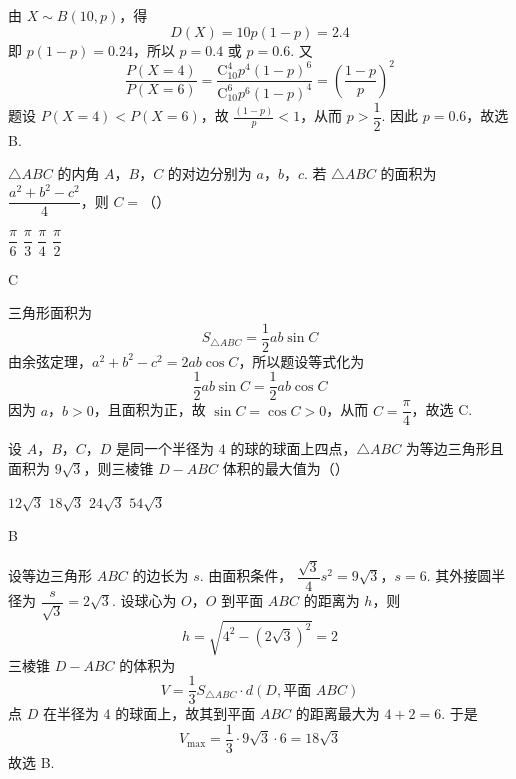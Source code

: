 \begin{solution}
由 \(X\sim B(10,p)\)，得
\[
D(X)=10p(1-p)=2.4
\]
即 \(p(1-p)=0.24\)，所以 \(p=0.4\) 或 \(p=0.6\). 又
\[
\dfrac{P(X=4)}{P(X=6)}
=\dfrac{\mathrm C_{10}^4p^4(1-p)^6}{\mathrm C_{10}^6p^6(1-p)^4}
=\left(\dfrac{1-p}{p}\right)^2
\]
题设 \(P(X=4)<P(X=6)\)，故 \(\frac{(1-p)}{p}<1\)，从而 \(p>\dfrac12\). 因此 \(p=0.6\)，故选 B.
\end{solution}

\begin{problem}
\(\triangle ABC\) 的内角 \(A\)，\(B\)，\(C\) 的对边分别为 \(a\)，\(b\)，\(c\). 若 \(\triangle ABC\) 的面积为 \(\dfrac{a^2+b^2-c^2}{4}\)，则 \(C=\)（\quad）

\choices
    {\(\dfrac{\pi}{6}\)}
    {\(\dfrac{\pi}{3}\)}
    {\(\dfrac{\pi}{4}\)}
    {\(\dfrac{\pi}{2}\)}
\end{problem}

\begin{answer}
C
\end{answer}

\begin{solution}
三角形面积为
\[
S_{\triangle ABC}=\dfrac12ab\sin C
\]
由余弦定理，\(a^2+b^2-c^2=2ab\cos C\)，所以题设等式化为
\[
\dfrac12ab\sin C=\dfrac12ab\cos C
\]
因为 \(a\)，\(b>0\)，且面积为正，故 \(\sin C=\cos C>0\)，从而 \(C=\dfrac\pi4\)，故选 C.
\end{solution}

\begin{problem}
设 \(A\)，\(B\)，\(C\)，\(D\) 是同一个半径为 \(4\) 的球的球面上四点，\(\triangle ABC\) 为等边三角形且面积为 \(9\sqrt3\)，则三棱锥 \(D-ABC\) 体积的最大值为（\quad）

\choices
    {\(12\sqrt3\)}
    {\(18\sqrt3\)}
    {\(24\sqrt3\)}
    {\(54\sqrt3\)}
\end{problem}

\begin{answer}
B
\end{answer}

\begin{solution}
设等边三角形 \(ABC\) 的边长为 \(s\). 由面积条件，
\(\dfrac{\sqrt3}{4}s^2=9\sqrt3\)，\(s=6\).
其外接圆半径为 \(\dfrac{s}{\sqrt3}=2\sqrt3\). 设球心为 \(O\)，\(O\) 到平面 \(ABC\) 的距离为 \(h\)，则
\[
h=\sqrt{4^2-(2\sqrt3)^2}=2
\]
三棱锥 \(D-ABC\) 的体积为
\[
V=\dfrac13S_{\triangle ABC}\cdot d(D,\text{平面 }ABC)
\]
点 \(D\) 在半径为 \(4\) 的球面上，故其到平面 \(ABC\) 的距离最大为 \(4+2=6\). 于是
\[
V_{\max}=\dfrac13\cdot9\sqrt3\cdot6=18\sqrt3
\]
故选 B.
\end{solution}

